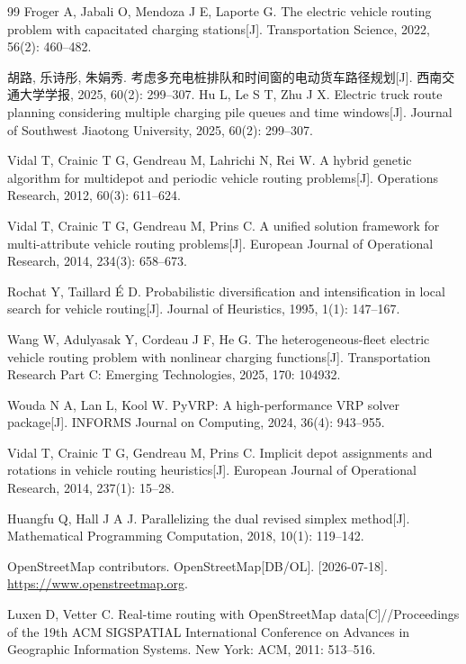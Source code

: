 \documentclass{setp-new}
\begin{document}
\begin{thebibliography}{99}
 Froger A, Jabali O, Mendoza J E, Laporte G. The electric vehicle routing problem with capacitated charging stations[J]. Transportation Science, 2022, 56(2): 460--482.

 胡路, 乐诗彤, 朱娟秀. 考虑多充电桩排队和时间窗的电动货车路径规划[J]. 西南交通大学学报, 2025, 60(2): 299--307.\newline
Hu L, Le S T, Zhu J X. Electric truck route planning considering multiple charging pile queues and time windows[J]. Journal of Southwest Jiaotong University, 2025, 60(2): 299--307.

 Vidal T, Crainic T G, Gendreau M, Lahrichi N, Rei W. A hybrid genetic algorithm for multidepot and periodic vehicle routing problems[J]. Operations Research, 2012, 60(3): 611--624.

 Vidal T, Crainic T G, Gendreau M, Prins C. A unified solution framework for multi-attribute vehicle routing problems[J]. European Journal of Operational Research, 2014, 234(3): 658--673.

 Rochat Y, Taillard \'E D. Probabilistic diversification and intensification in local search for vehicle routing[J]. Journal of Heuristics, 1995, 1(1): 147--167.

 Wang W, Adulyasak Y, Cordeau J F, He G. The heterogeneous-fleet electric vehicle routing problem with nonlinear charging functions[J]. Transportation Research Part C: Emerging Technologies, 2025, 170: 104932.

 Wouda N A, Lan L, Kool W. PyVRP: A high-performance VRP solver package[J]. INFORMS Journal on Computing, 2024, 36(4): 943--955.

 Vidal T, Crainic T G, Gendreau M, Prins C. Implicit depot assignments and rotations in vehicle routing heuristics[J]. European Journal of Operational Research, 2014, 237(1): 15--28.

 Huangfu Q, Hall J A J. Parallelizing the dual revised simplex method[J]. Mathematical Programming Computation, 2018, 10(1): 119--142.

 OpenStreetMap contributors. OpenStreetMap[DB/OL]. [2026-07-18]. \url{https://www.openstreetmap.org}.

 Luxen D, Vetter C. Real-time routing with OpenStreetMap data[C]//Proceedings of the 19th ACM SIGSPATIAL International Conference on Advances in Geographic Information Systems. New York: ACM, 2011: 513--516.


\end{thebibliography}
\end{document}
